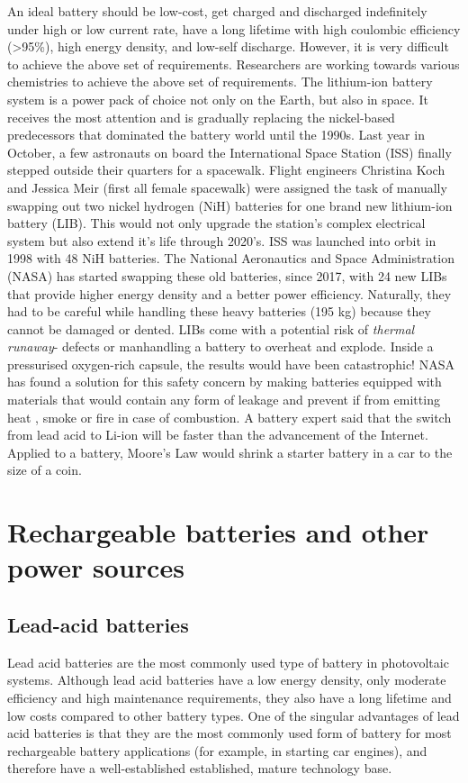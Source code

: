 An ideal battery should be low-cost, get charged and discharged indefinitely under high or low current rate, have a long lifetime with high coulombic efficiency (>95\%), high energy density, and low-self discharge. However, it is very difficult to achieve the above set of requirements. Researchers are working towards various chemistries to achieve the above set of requirements. The lithium-ion battery system is a power pack of choice not only on the Earth, but also in space. It receives the most attention and is gradually replacing the nickel-based predecessors that dominated the battery world until the 1990s. Last year in October, a few astronauts on board the International Space Station (ISS) finally stepped outside their quarters for a spacewalk. Flight engineers Christina Koch and Jessica Meir (first all female spacewalk) were assigned the task of manually swapping out two nickel hydrogen (NiH) batteries for one brand new lithium-ion battery (LIB). This would not only upgrade the station's complex electrical system but also extend it's life through 2020's. ISS was launched into orbit in 1998 with 48 NiH batteries. The National Aeronautics and Space Administration (NASA) has started swapping these old batteries, since 2017, with 24 new LIBs  that provide higher energy density and a better power efficiency. Naturally, they had to be careful while handling these heavy batteries (195 kg) because they cannot be damaged or dented. LIBs come with a potential risk of \textit{thermal runaway}- defects or manhandling a battery to overheat and explode. Inside a pressurised oxygen-rich capsule, the results would have been catastrophic! NASA has found a solution for this safety concern by making batteries equipped with materials that would contain any form of leakage and prevent if from emitting heat , smoke or fire in case of combustion. 
A battery expert said that the switch from lead acid to Li-ion will be faster than the advancement of the Internet. Applied to a battery, Moore’s Law would shrink a starter battery in a car to the size of a coin.
\section{Rechargeable batteries and other power sources}
\subsection{Lead-acid batteries}
Lead acid batteries are the most commonly used type of battery in photovoltaic systems. Although lead acid batteries have a low energy density, only moderate efficiency and high maintenance requirements, they also have a long lifetime and low costs compared to other battery types. One of the singular advantages of lead acid batteries is that they are the most commonly used form of battery for most rechargeable battery applications (for example, in starting car engines), and therefore have a well-established established, mature technology base.
